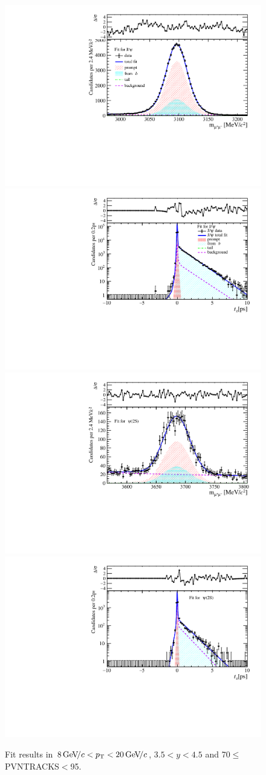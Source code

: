 \begin{figure}[H]
\begin{center}
\includegraphics[width=0.47\linewidth]{pdf/Jpsi/drawmass/n4y3pt5.pdf}
\includegraphics[width=0.47\linewidth]{pdf/Jpsi/2DFit/n4y3pt5.pdf}
\vspace*{-0.5cm}
\includegraphics[width=0.47\linewidth]{pdf/Psi2S/drawmass/n4y3pt5.pdf}
\includegraphics[width=0.47\linewidth]{pdf/Psi2S/2DFit/n4y3pt5.pdf}
\vspace*{-0.5cm}
\end{center}
\caption{Fit results in $8\text{\,Ge\kern -0.1em V\!/}c<p_{\mathrm{T}}<20\text{\,Ge\kern -0.1em V\!/}c$, $3.5<y<4.5$ and 70$\leq$PVNTRACKS$<$95.}
\label{Fitn4y3pt5}
\end{figure}
